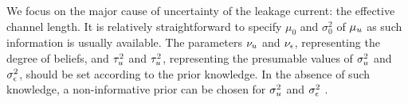 We focus on the major cause of uncertainty of the leakage current: the effective channel length. It is relatively straightforward to specify $\mu_0$ and $\sigma^2_0$ of $\mu_u$ as such information is usually available. The parameters $\nu_u$ and $\nu_\epsilon$, representing the degree of beliefs, and $\tau^2_u$ and $\tau^2_u$, representing the presumable values of $\sigma^2_u$ and $\sigma^2_\epsilon$, should be set according to the prior knowledge. In the absence of such knowledge, a non-informative prior can be chosen for $\sigma^2_u$ and $\sigma^2_\epsilon$ \cite{gelman2004}.
